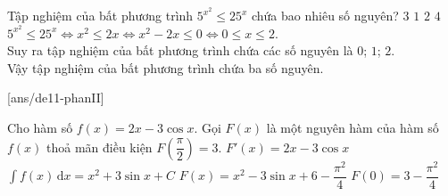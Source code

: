 \begin{ex}%
	Tập nghiệm của bất phương trình $5^{x^2}\le 25^x$ chứa bao nhiêu số nguyên?
	\choice
	{\True $3$}
	{$1$}
	{$2$}
	{$4$}
	\loigiai
	{
		$5^{x^2}\le 25^x \Leftrightarrow x^2 \leq 2x \Leftrightarrow x^2-2x\leq 0 \Leftrightarrow 0\leq x \leq 2$.\\
		Suy ra tập nghiệm của bất phương trình chứa các số nguyên là $0$; $1$; $2$.\\
		Vậy tập nghiệm của bất phương trình chứa ba số nguyên.
	}
\end{ex}
\TNTF
{}[ans/de11-phanII]
\begin{ex}%
	Cho hàm số $f(x)=2x-3\cos x$. Gọi $F(x)$ là một nguyên hàm của hàm số $f(x)$ thoả mãn điều kiện $F\left(\dfrac{\pi}{2}\right)=3$.
	\choiceTF
	{\True $F'(x)=2x-3\cos x$}
	{$\displaystyle\int f(x)\mathrm{\, d}x=x^2+3\sin x+C$}
	{\True $F(x)=x^2-3\sin x+6-\dfrac{\pi^2}{4}$}
	{$F(0)=3-\dfrac{\pi^2}{4}$}
\end{ex}


